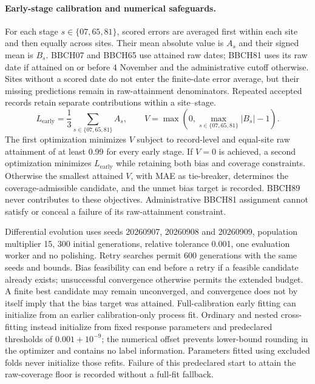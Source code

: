 \documentclass[a4paper,11pt]{article}
\begin{document}
\paragraph{Early-stage calibration and numerical safeguards.}
For each stage $s\in\{07,65,81\}$, scored errors are averaged first within each site and then equally across sites. Their mean absolute value is $A_s$ and their signed mean is $B_s$. BBCH07 and BBCH65 use attained raw dates; BBCH81 uses its raw date if attained on or before 4 November and the administrative cutoff otherwise. Sites without a scored date do not enter the finite-date error average, but their missing predictions remain in raw-attainment denominators. Repeated accepted records retain separate contributions within a site--stage.
\begin{equation}
L_{\mathrm{early}}=\frac{1}{3}\sum_{s\in\{07,65,81\}} A_s,
\qquad V=\max\left(0,\max_{s\in\{07,65,81\}}|B_s|-1\right).
\label{eq:calibration_loss}
\end{equation}
The first optimization minimizes $V$ subject to record-level and equal-site raw attainment of at least 0.99 for every early stage. If $V=0$ is achieved, a second optimization minimizes $L_{\mathrm{early}}$ while retaining both bias and coverage constraints. Otherwise the smallest attained $V$, with MAE as tie-breaker, determines the coverage-admissible candidate, and the unmet bias target is recorded. BBCH89 never contributes to these objectives. Administrative BBCH81 assignment cannot satisfy or conceal a failure of its raw-attainment constraint.

Differential evolution uses seeds 20260907, 20260908 and 20260909, population multiplier 15, 300 initial generations, relative tolerance 0.001, one evaluation worker and no polishing. Retry searches permit 600 generations with the same seeds and bounds. Bias feasibility can end before a retry if a feasible candidate already exists; unsuccessful convergence otherwise permits the extended budget. A finite best candidate may remain unconverged, and convergence does not by itself imply that the bias target was attained. Full-calibration early fitting can initialize from an earlier calibration-only process fit. Ordinary and nested cross-fitting instead initialize from fixed response parameters and predeclared thresholds of $0.001+10^{-9}$; the numerical offset prevents lower-bound rounding in the optimizer and contains no label information. Parameters fitted using excluded folds never initialize those refits. Failure of this predeclared start to attain the raw-coverage floor is recorded without a full-fit fallback.
\end{document}
